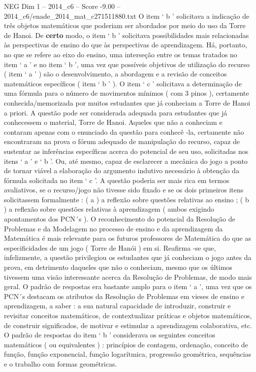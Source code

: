 \begin{textsample}{NEG Dim 1 – 2014\_c6 – Score -9.00 – 2014\_c6/enade\_2014\_mat\_c271511880.txt}
O item ‘ b ’ solicitava a indicação de três objetos matemáticos que poderiam ser abordados por meio do uso da Torre de Hanoi.
De \textbf{certo} modo, o item ‘ b ’ solicitava possibilidades mais relacionadas às perspectivas de ensino do que às perspectivas de aprendizagem.
Há, portanto, no que se refere ao eixo do ensino, uma interseção entre os temas tratados no item ‘ a ’ e no item ‘ b ’, uma vez que possíveis objetivos de utilização do recurso ( item ‘ a ’ ) são o desenvolvimento, a abordagem e a revisão de conceitos matemáticos específicos ( item ‘ b ’ ).
O item ‘ c ’ solicitava a determinação de uma fórmula para o número de movimentos mínimos ( com 3 pinos ), certamente conhecida/memorizada por muitos estudantes que já conheciam a Torre de Hanoi a priori.
A questão pode ser considerada adequada para estudantes que já conhecessem o material, Torre de Hanoi.
Aqueles que não a conheciam e contaram apenas com o enunciado da questão para conhecê -la, certamente não encontraram na prova o fórum adequado de manipulação do recurso, capaz de sustentar as inferências específicas acerca do potencial de seu uso, solicitadas nos itens ‘ a ’ e ‘ b ’.
Ou, até mesmo, capaz de esclarecer a mecânica do jogo a ponto de tornar viável a elaboração do argumento indutivo necessário à obtenção da fórmula solicitada no item ‘ c ’.
A questão poderia ser mais rica em termos avaliativos, se o recurso/jogo não tivesse sido fixado e se os dois primeiros itens solicitassem formalmente : ( a ) a reflexão sobre questões relativas ao ensino ; ( b ) a reflexão sobre questões relativas à aprendizagem ( ambos exigindo apontamentos dos PCN´s ).
O reconhecimento do potencial da Resolução de Problemas e da Modelagem no processo de ensino e da aprendizagem da Matemática é mais relevante para os futuros professores de Matemática do que as especificidades de um jogo ( Torre de Hanói ) em si.
Reafirma -se que, infelizmente, a questão privilegiou os estudantes que já conheciam o jogo antes da prova, em detrimento daqueles que não o conheciam, mesmo que os últimos tivessem uma visão interessante acerca da Resolução de Problemas, de modo mais geral.
O padrão de respostas era bastante amplo para o item ‘ a ’, uma vez que os PCN´s destacam os atributos da Resolução de Problemas em vieses de ensino e aprendizagem, a saber : a sua natural capacidade de introduzir, construir e revisitar conceitos matemáticos, de contextualizar práticas e objetos matemáticos, de construir significados, de motivar e estimular a aprendizagem colaborativa, etc.
O padrão de respostas do item ‘ b ’ considerava os seguintes conceitos matemáticos ( ou equivalentes ) : princípios de contagem, ordenação, conceito de função, função exponencial, função logarítmica, progressão geométrica, sequências e o trabalho com formas geométricas.

\end{textsample}
